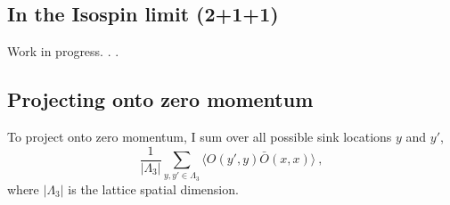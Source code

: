 \documentclass[11pt]{article}
\begin{document}
\subsection{In the Isospin limit (2+1+1)}
Work in progress. . .

\subsection{Projecting onto zero momentum}
To project onto zero momentum, I sum over all possible sink locations $y$ and $y'$,
\begin{displaymath}
\frac{1}{|\Lambda_3|}\sum_{y,y'\in\Lambda_3}\langle O(y',y)\bar O(x,x)\rangle\ ,
\end{displaymath}
where $|\Lambda_3|$ is the lattice spatial dimension.




%
\end{document}
